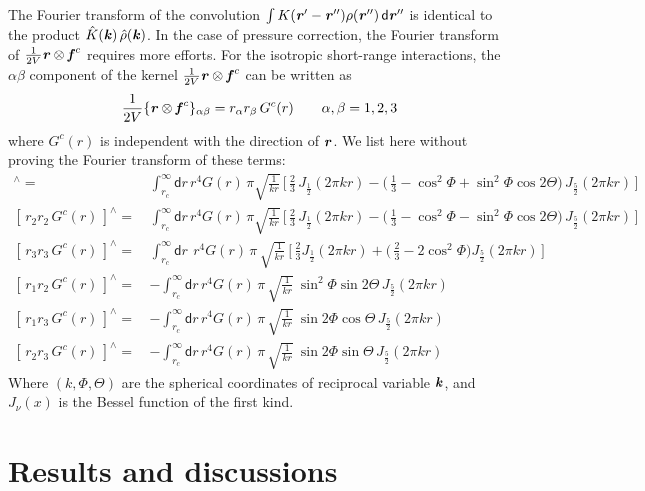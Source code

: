 \documentclass[aps,pre,preprint]{revtex4}
\renewcommand{\v}[1]{\textbf{\textit{#1}}}
\renewcommand{\d}[1]{\textsf{#1}}
\begin{document}
The Fourier transform of the convolution $\int K(\v r' - \v r'')
\rho(\v r'')\,\d d\v r''$ is identical to the product $\hat K(\v
k)\,\hat \rho(\v k)$. In the case of pressure correction, the Fourier
transform of $\frac{1}{2V}\v r\otimes\v f^c$ requires more efforts.
For the isotropic short-range interactions, the $\alpha\beta$
component of the kernel $\frac{1}{2V}\v r\otimes\v f^c$ can be written
as
\begin{align}
  \frac1{2V}\{\v r\otimes\v f^c\}_{\alpha\beta} =
  r_\alpha r_\beta \,G^c(r) \qquad \alpha, \beta = 1, 2, 3
\end{align}
where $G^c(r)$ is independent with the direction of $\v r$.  We list
here without proving the Fourier transform of these terms:
\begin{align}
  [\,r_1r_1\,G^c(r)\,]^{\wedge} 
  =\,& 
  \int_{r_c}^\infty \d dr\, r^4 G(r)\,
  \pi \sqrt{ \frac1{kr} }\,
  \Big[\,
  \frac23\,J_{\frac12}(2\pi kr) -
  \big(\,
  \frac13 -
  \cos^2\Phi +
  \sin^2\Phi\cos2\Theta
  \big)\, J_{\frac52}(2\pi kr)
  \,\Big] \\
  [\,r_2 r_2\,G^c(r)\,]^{\wedge} 
  =\,& 
  \int_{r_c}^\infty \d dr\, r^4 G(r)\,
  \pi \sqrt{ \frac1{kr} }\,
  \Big[\,
  \frac23\,J_{\frac12}(2\pi kr) -
  \big(\,
  \frac13 -
  \cos^2\Phi -
  \sin^2\Phi\cos2\Theta
  \big)\, J_{\frac52}(2\pi kr)
  \,\Big]   \\
  [\,r_3 r_3\,G^c(r)\,]^{\wedge} 
  =\,& 
  \int_{r_c}^\infty \d dr\: \,r^4 G(r)\,\pi\,
  \sqrt{ \frac1{kr} }\,
  \Big[\,
  \frac23 J_{\frac12}(2\pi kr) +
  \big(\,
  \frac23 - 2\cos^2\Phi
  \big)
  J_{\frac52}(2\pi kr)
  \,\Big]\\
  [\,r_1 r_2\,G^c(r)\,]^{\wedge} 
  =\,& -
  \int_{r_c}^\infty
  \d dr\,
  r^4G(r)\,\pi\,
  \sqrt{\frac1{kr}}\:
  \sin^2\Phi\sin 2\Theta\,J_{\frac52}(2\pi kr)\\
  [\,r_1 r_3\,G^c(r)\,]^{\wedge} 
  =\,& -
  \int_{r_c}^\infty
  \d dr\,
  r^4G(r)\,\pi\,
  \sqrt{\frac1{kr}}\:
  \sin2\Phi\cos\Theta\,J_{\frac52}(2\pi kr)\\
  [\,r_2 r_3\,G^c(r)\,]^{\wedge} 
  =\,& -
  \int_{r_c}^\infty
  \d dr\,
  r^4G(r)\,\pi\,
  \sqrt{\frac1{kr}}\:
  \sin2\Phi\sin\Theta\,J_{\frac52}(2\pi kr)
\end{align}
Where $(k, \Phi, \Theta)$ are the spherical coordinates of reciprocal
variable $\v k$, and $J_\nu(x)$ is the Bessel function of the first
kind.



\section{Results and discussions}\label{sec:tmp2}
\end{document}
